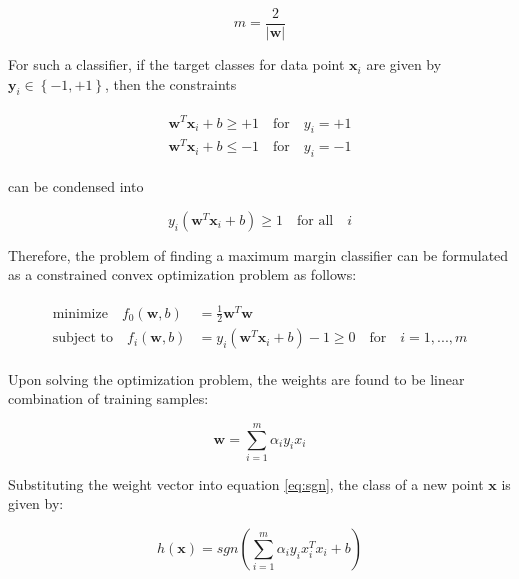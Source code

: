 $$
m=\frac{2}{|\mathbf{w}|}
$$

For such a classifier, if the target classes for data point $\mathbf{x}_i$ are given by $\mathbf{y}_i \in \left\lbrace -1, +1 \right\rbrace$, then the constraints

\begin{align}
\begin{aligned}
\mathbf{w}^{T}\mathbf{x}_i + b \geq +1 \quad \text{for} \quad y_i = +1 \\
\mathbf{w}^{T}\mathbf{x}_i + b \leq -1 \quad \text{for} \quad y_i = -1
\end{aligned}
\end{align}

can be condensed into 

$$
y_i (\mathbf{w}^{T}\mathbf{x}_i + b) \geq 1 \quad \text{for all} \quad i
$$

Therefore, the problem of finding a maximum margin classifier can be formulated as a constrained convex optimization problem as follows:

\begin{align}
\begin{aligned}
\text{minimize} \quad f_0(\mathbf{w},b) &= \frac{1}{2} \mathbf{w}^{T} \mathbf{w} \\
\text{subject to} \quad f_i(\mathbf{w},b) &= y_i (\mathbf{w}^{T}\mathbf{x}_i + b) -1 \geq 0 \quad \text{for} \quad i = 1,...,m
\end{aligned}
\end{align}

Upon solving the optimization problem, the weights are found to be linear combination of training samples:

$$
\mathbf{w} = \sum^{m}_{i=1} \alpha_i y_i x_i
$$

Substituting the weight vector into equation \ref{eq:sgn}, the class of a new point $\mathbf{x}$ is given by:

$$
h(\mathbf{x}) = sgn(\sum^{m}_{i=1} \alpha_i y_i x_i^{T} x_i + b)
$$


